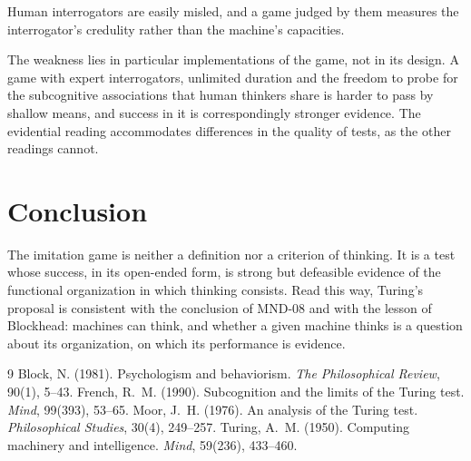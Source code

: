 \documentclass{situationist-preprint}
\begin{document}
\begin{objection}
Human interrogators are easily misled, and a game judged by them measures the interrogator's credulity rather than the machine's capacities.
\end{objection}

\begin{reply}
The weakness lies in particular implementations of the game, not in its design. A game with expert interrogators, unlimited duration and the freedom to probe for the subcognitive associations that human thinkers share \citep{French1990} is harder to pass by shallow means, and success in it is correspondingly stronger evidence. The evidential reading accommodates differences in the quality of tests, as the other readings cannot.
\end{reply}

\section{Conclusion}

The imitation game is neither a definition nor a criterion of thinking. It is a test whose success, in its open-ended form, is strong but defeasible evidence of the functional organization in which thinking consists. Read this way, Turing's proposal is consistent with the conclusion of MND-08 and with the lesson of Blockhead: machines can think, and whether a given machine thinks is a question about its organization, on which its performance is evidence.

\begin{thebibliography}{9}\small
{} Block, N. (1981). Psychologism and behaviorism. \emph{The Philosophical Review}, 90(1), 5--43.
 French, R.~M. (1990). Subcognition and the limits of the Turing test. \emph{Mind}, 99(393), 53--65.
 Moor, J.~H. (1976). An analysis of the Turing test. \emph{Philosophical Studies}, 30(4), 249--257.
 Turing, A.~M. (1950). Computing machinery and intelligence. \emph{Mind}, 59(236), 433--460.
\end{thebibliography}
\end{document}
